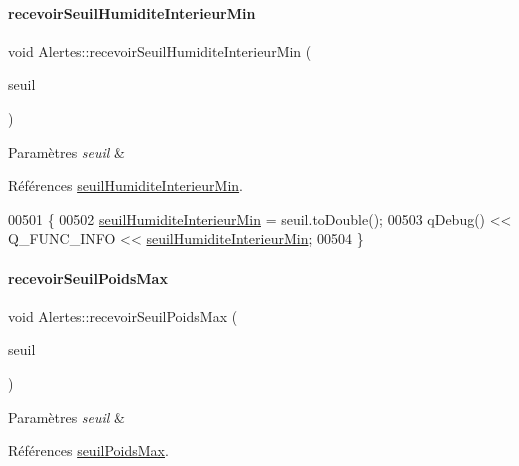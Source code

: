 \paragraph{\texorpdfstring{recevoir\+Seuil\+Humidite\+Interieur\+Min}{recevoirSeuilHumiditeInterieurMin}}
{\footnotesize\ttfamily void Alertes\+::recevoir\+Seuil\+Humidite\+Interieur\+Min (\begin{DoxyParamCaption}\item[{Q\+String}]{seuil }\end{DoxyParamCaption})\hspace{0.3cm}{\ttfamily [slot]}}


\begin{DoxyParams}{Paramètres}
{\em seuil} & \\
\hline
\end{DoxyParams}


Références \hyperlink{class_alertes_a501773587c8f2ccd032fe7db9af1f4e2}{seuil\+Humidite\+Interieur\+Min}.


\begin{DoxyCode}
00501 \{
00502     \hyperlink{class_alertes_a501773587c8f2ccd032fe7db9af1f4e2}{seuilHumiditeInterieurMin} = seuil.toDouble();
00503     qDebug() << Q\_FUNC\_INFO << \hyperlink{class_alertes_a501773587c8f2ccd032fe7db9af1f4e2}{seuilHumiditeInterieurMin};
00504 \}
\end{DoxyCode}
\mbox{\label{class_alertes_a77b71a5bc047ced8d09f59a521f58616}} 
\paragraph{\texorpdfstring{recevoir\+Seuil\+Poids\+Max}{recevoirSeuilPoidsMax}}
{\footnotesize\ttfamily void Alertes\+::recevoir\+Seuil\+Poids\+Max (\begin{DoxyParamCaption}\item[{Q\+String}]{seuil }\end{DoxyParamCaption})\hspace{0.3cm}{\ttfamily [slot]}}


\begin{DoxyParams}{Paramètres}
{\em seuil} & \\
\hline
\end{DoxyParams}


Références \hyperlink{class_alertes_a19b88c68325ccc6e5e8ad11a2537b25e}{seuil\+Poids\+Max}.



